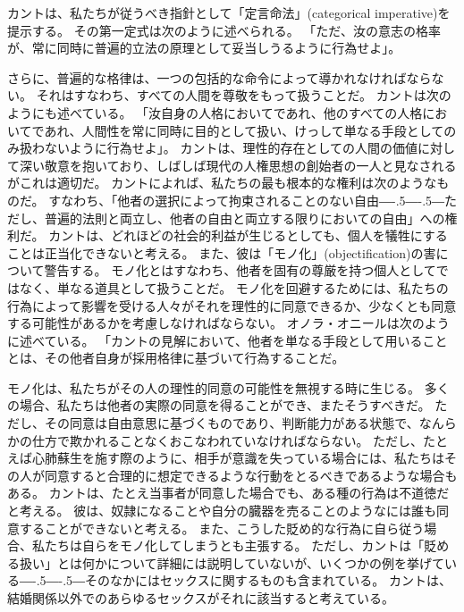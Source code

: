 \documentclass[paper=a4,book,openany]{jlreq}
\def\DDASH{―\kern-.5\zw―\kern-.5\zw―} %
\begin{document}
カントは、私たちが従うべき指針として「定言命法」(categorical imperative)を提示する。
その第一定式は次のように述べられる。
「ただ、汝の意志の格率が、常に同時に普遍的立法の原理として妥当しうるように行為せよ」\citep[4:421, p.34]{kant11:_groun_metap_moral}。

さらに、普遍的な格律は、一つの包括的な命令によって導かれなければならない。
それはすなわち、すべての人間を尊敬をもって扱うことだ。
カントは次のようにも述べている。
「汝自身の人格においてであれ、他のすべての人格においてであれ、人間性を常に同時に目的として扱い、けっして単なる手段としてのみ扱わないように行為せよ」\citep[4:429, p.41]{kant11:_groun_metap_moral}。
カントは、理性的存在としての人間の価値に対して深い敬意を抱いており、しばしば現代の人権思想の創始者の一人と見なされるがこれは適切だ。
カントによれば、私たちの最も根本的な権利は次のようなものだ。
すなわち、「他者の選択によって拘束されることのない自由{\DDASH}ただし、普遍的法則と両立し、他者の自由と両立する限りにおいての自由」\citep[6:237]{kant96:_metap_moral}への権利だ。
カントは、どれほどの社会的利益が生じるとしても、個人を犠牲にすることは正当化できないと考える。
また、彼は「モノ化」(objectification)の害について警告する。
モノ化とはすなわち、他者を固有の尊厳を持つ個人としてではなく、単なる道具として扱うことだ。
モノ化を回避するためには、私たちの行為によって影響を受ける人々がそれを理性的に同意できるか、少なくとも同意する可能性があるかを考慮しなければならない。
オノラ・オニールは次のように述べている。
「カントの見解において、他者を単なる手段として用いることとは、その他者自身が採用格律に基づいて行為することだ\citep[p.138]{oneill89:_const_reason}。

モノ化は、私たちがその人の理性的同意の可能性を無視する時に生じる。
多くの場合、私たちは他者の実際の同意を得ることができ、またそうすべきだ。
ただし、その同意は自由意思に基づくものであり、判断能力がある状態で、なんらかの仕方で欺かれることなくおこなわれていなければならない。
ただし、たとえば心肺蘇生を施す際のように、相手が意識を失っている場合には、私たちはその人が同意すると合理的に想定できるような行動をとるべきであるような場合もある。
カントは、たとえ当事者が同意した場合でも、ある種の行為は不道徳だと考える。
彼は、奴隷になることや自分の臓器を売ることのようなには誰も同意することができないと考える。
また、こうした貶め的な行為に自ら従う場合、私たちは自らをモノ化してしまうとも主張する。
ただし、カントは「貶める扱い」とは何かについて詳細には説明していないが、いくつかの例を挙げている{\DDASH}そのなかにはセックスに関するものも含まれている。
カントは、結婚関係以外でのあらゆるセックスがそれに該当すると考えている。
\end{document}
